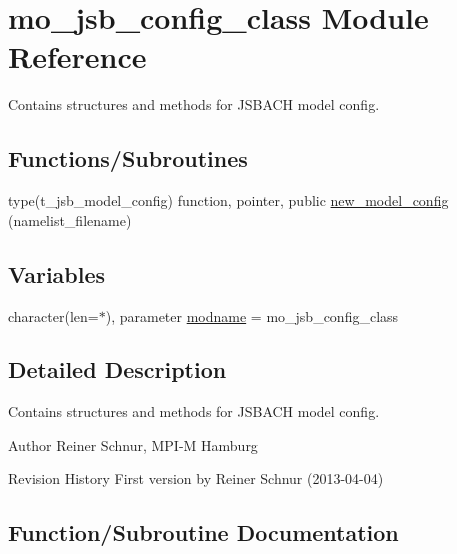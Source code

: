 \hypertarget{namespacemo__jsb__config__class}{}\section{mo\+\_\+jsb\+\_\+config\+\_\+class Module Reference}
\label{namespacemo__jsb__config__class}


Contains structures and methods for J\+S\+B\+A\+C\+H model config.  


\subsection*{Functions/\+Subroutines}
\begin{DoxyCompactItemize}
\item 
type(t\+\_\+jsb\+\_\+model\+\_\+config) function, pointer, public \hyperlink{namespacemo__jsb__config__class_a1954d6f33b1cea7b395655837a1377db}{new\+\_\+model\+\_\+config} (namelist\+\_\+filename)
\end{DoxyCompactItemize}
\subsection*{Variables}
\begin{DoxyCompactItemize}
\item 
character(len=$\ast$), parameter \hyperlink{namespacemo__jsb__config__class_afe047bc8cf7a4d227f9421eaa14e2d80}{modname} = \textquotesingle{}mo\+\_\+jsb\+\_\+config\+\_\+class\textquotesingle{}
\end{DoxyCompactItemize}


\subsection{Detailed Description}
Contains structures and methods for J\+S\+B\+A\+C\+H model config. 

\begin{DoxyAuthor}{Author}
Reiner Schnur, M\+P\+I-\/\+M Hamburg
\end{DoxyAuthor}
\begin{DoxyParagraph}{Revision History}
First version by Reiner Schnur (2013-\/04-\/04) 
\end{DoxyParagraph}


\subsection{Function/\+Subroutine Documentation}
\hypertarget{namespacemo__jsb__config__class_a1954d6f33b1cea7b395655837a1377db}{}
